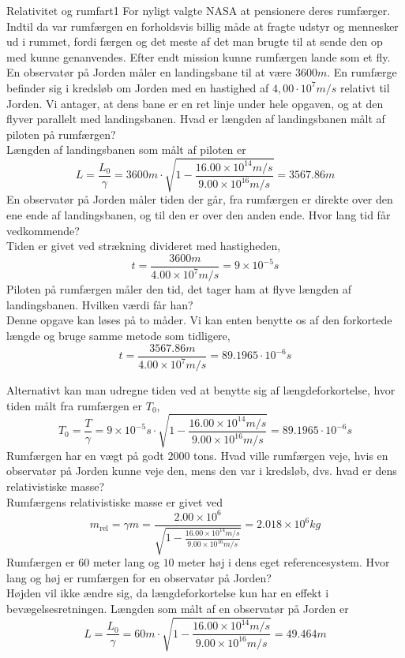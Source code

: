 \begin{opgave}{Relativitet og rumfart}{1}
	For nyligt valgte NASA at pensionere deres rumfærger. Indtil da var rumfærgen en forholdsvis billig måde at
	fragte udstyr og mennesker ud i rummet, fordi færgen og det meste af det man brugte til at sende den op med
	kunne genanvendes. Efter endt mission kunne rumfærgen lande som et fly.\\
	\indent
	En observatør på Jorden måler en landingsbane til at være $3600 \si{m}$. En rumfærge befinder sig i kredsløb om
	Jorden med en hastighed af $4,00 \cdot 10^7 \si{m/s}$ relativt til Jorden. Vi antager, at dens bane er en ret linje under hele
	opgaven, og at den flyver parallelt med landingsbanen.
	\opg Hvad er længden af landingsbanen målt af piloten på rumfærgen?\\
	
	Længden af landingsbanen som målt af piloten er
	$$L=\frac{L_0}{\gamma}=3600 \si{m} \cdot \sqrt{1-\frac{16.00 \times 10^{14} \si{m/s}}{9.00 \times 10^{16} \si{m/s}}} = 3567.86 \si{m}$$
	\opg En observatør på Jorden måler tiden der går, fra rumfærgen er direkte over den ene ende af landingsbanen,
	og til den er over den anden ende. Hvor lang tid får vedkommende?\\
	
	Tiden er givet ved strækning divideret med hastigheden,
	$$t=\frac{3600 \si{m}}{4.00 \times 10^7 \si{m/s}} = 9 \times 10^{-5} \si{s}$$
	\opg Piloten på rumfærgen måler den tid, det tager ham at flyve længden af landingsbanen. Hvilken værdi får
	han?\\
	
	Denne opgave kan løses på to måder. Vi kan enten benytte os af den forkortede længde og bruge samme metode som tidligere,
	$$t=\frac{3567.86 \si{m}}{4.00 \times 10^7 \si{m/s}}=89.1965 \cdot 10^{-6} \si{s}$$
	
	Alternativt kan man udregne tiden ved at benytte sig af længdeforkortelse, hvor tiden målt fra rumfærgen er $T_0$,
	$$T_0=\frac{T}{\gamma}=9 \times 10^{-5} \si{s} \cdot \sqrt{1-\frac{16.00 \times 10^{14} \si{m/s}}{9.00 \times 10^{16} \si{m/s}}}=89.1965 \cdot 10^{-6} \si{s}$$
	\opg Rumfærgen har en vægt på godt $2000$ tons. Hvad ville rumfærgen veje, hvis en observatør på Jorden
	kunne veje den, mens den var i kredsløb, dvs. hvad er dens relativistiske masse?\\
	
	Rumfærgens relativistiske masse er givet ved
	$$m_{\text{rel}}=\gamma m=\frac{2.00 \times 10^6}{\sqrt{1-\frac{16.00 \times 10^{14} \si{m/s}}{9.00 \times 10^{16} \si{m/s}}}}=2.018 \times 10^6 \si{kg}$$
	\opg Rumfærgen er $60$ meter lang og $10$ meter høj i dens eget referencesystem. Hvor lang og høj er rumfærgen
	for en observatør på Jorden?\\
	
	Højden vil ikke ændre sig, da længdeforkortelse kun har en effekt i bevægelsesretningen. Længden som målt af en observatør på Jorden er
	$$L=\frac{L_0}{\gamma}=60 \si{m} \cdot \sqrt{1-\frac{16.00 \times 10^{14} \si{m/s}}{9.00 \times 10^{16} \si{m/s}}}=49.464 \si{m}$$
\end{opgave}

